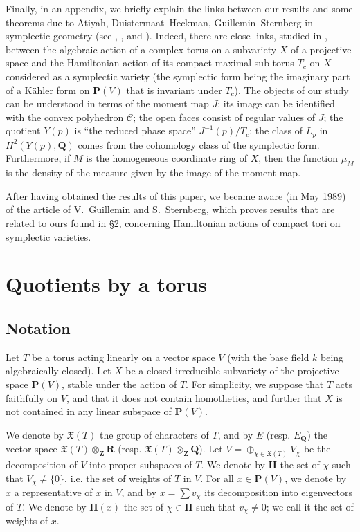 \documentclass{article}
\newcommand{\PP}{\mathbf{P}}
\newcommand{\QQ}{\mathbf{Q}}
\newcommand{\ZZ}{\mathbf{Z}}
\newcommand{\RR}{\mathbf{R}}
\newcommand{\II}{\mathbf{II}}
\newcommand{\oldpage}[1]{\marginpar{\footnotesize$\Big\vert$ \textit{p.~#1}}}
\begin{document}
Finally, in an appendix, we briefly explain the links between our results and some theorems due to Atiyah, Duistermaat--Heckman, Guillemin--Sternberg in symplectic geometry (see \cite{Ati}, \cite{DH12}, and \cite{GS12}).
Indeed, there are close links, studied in \cite{Kir}, between the algebraic action of a complex torus on a subvariety $X$ of a projective space and the Hamiltonian action of its compact maximal sub-torus $T_c$ on $X$ considered as a symplectic variety (the symplectic form being the imaginary part of a K\"{a}hler form on $\PP(V)$ that is invariant under $T_c$).
The objects of our study can be understood in terms of the moment map $J$:
its image can be identified with the convex polyhedron $\mathcal{C}$;
the open faces consist of regular values of $J$;
the quotient $Y(p)$ is ``the reduced phase space'' $J^{-1}(p)/T_c$;
the class of $L_p$ in $H^2(Y(p),\QQ)$ comes from the cohomology class of the symplectic form.
Furthermore, if $M$ is the homogeneous coordinate ring of $X$, then the function $\mu_M$ is the density of the measure given by the image of the moment map.

After having obtained the results of this paper, we became aware (in May 1989) of the article \cite{GS3} of V.~Guillemin and S.~Sternberg, which proves results that are related to ours found in \hyperref[2]{\S2}, concerning Hamiltonian actions of compact tori on symplectic varieties.


\section{Quotients by a torus}
\label{1}

\subsection{Notation}
\label{1.1}

Let $T$ be a torus acting linearly on a vector space $V$ (with the base field $k$ being algebraically closed).
Let $X$ be a closed irreducible subvariety of the projective space $\PP(V)$, stable under the action of $T$.
For simplicity, we suppose
\oldpage{512}
that $T$ acts faithfully on $V$, and that it does not contain homotheties, and further that $X$ is not contained in any linear subspace of $\PP(V)$.

We denote by $\mathfrak{X}(T)$ the group of characters of $T$, and by $E$ (resp. $E_\QQ$) the vector space $\mathfrak{X}(T)\otimes_\ZZ\RR$ (resp. $\mathfrak{X}(T)\otimes_\ZZ\QQ$).
Let $V=\oplus_{\chi\in\mathfrak{X}(T)}V_\chi$ be the decomposition of $V$ into proper subspaces of $T$.
We denote by $\II$ the set of $\chi$ such that $V_\chi\neq\{0\}$, i.e. the set of weights of $T$ in $V$.
For all $x\in\PP(V)$, we denote by $\bar{x}$ a representative of $x$ in $V$, and by $\bar{x}=\sum v_\chi$ its decomposition into eigenvectors of $T$.
We denote by $\II(x)$ the set of $\chi\in\II$ such that $v_\chi\neq0$;
we call it the set of weights of $x$.
\end{document}
